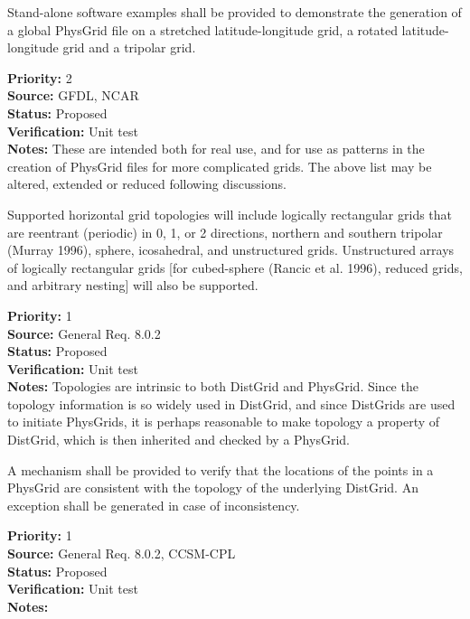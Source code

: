 Stand-alone software examples shall be provided to demonstrate the generation of a
global PhysGrid file on a stretched latitude-longitude grid, a rotated
latitude-longitude grid and a tripolar grid. 
\begin{reqlist}
{\bf Priority:} 2 \\
{\bf Source:} GFDL, NCAR \\
{\bf Status:} Proposed \\
{\bf Verification:} Unit test\\
{\bf Notes:} These are intended both for real use, and for use as patterns in the
creation of PhysGrid files for more complicated grids.  The above list may be
altered, extended or reduced following discussions.
\end{reqlist}

 Supported horizontal grid topologies will include
logically rectangular grids that are reentrant (periodic) in 0, 1, or 2 directions,
northern and southern tripolar (Murray 1996), sphere, icosahedral, and unstructured
grids.  Unstructured arrays of logically rectangular grids [for cubed-sphere (Rancic
et al. 1996), reduced grids, and arbitrary nesting] will also be supported.
\begin{reqlist}
{\bf Priority:} 1 \\
{\bf Source:} General Req. 8.0.2 \\
{\bf Status:} Proposed \\
{\bf Verification:} Unit test\\
{\bf Notes:}  Topologies are intrinsic to both DistGrid and PhysGrid.  Since
the topology information is so widely used in DistGrid, and since DistGrids
are used to initiate PhysGrids, it is perhaps reasonable to make topology a
property of DistGrid, which is then inherited and checked by a PhysGrid.
\end{reqlist}

A mechanism shall be provided to verify that the locations of the points in
a PhysGrid are consistent with the topology of the underlying DistGrid.  An
exception shall be generated in case of inconsistency.
\begin{reqlist}
{\bf Priority:} 1 \\
{\bf Source:} General Req. 8.0.2, CCSM-CPL \\
{\bf Status:} Proposed \\
{\bf Verification:} Unit test\\
{\bf Notes:}
\end{reqlist}

